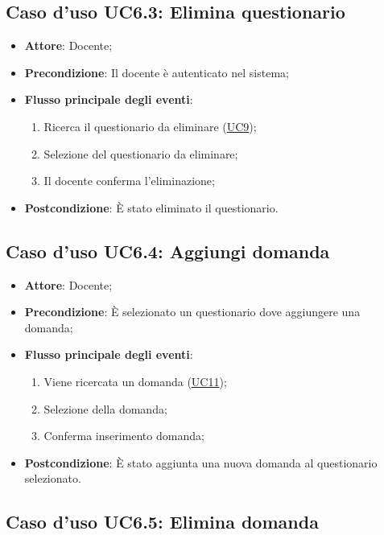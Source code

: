 \documentclass[12pt,a4paper]{article}
\begin{document}
\subsection{Caso d'uso UC6.3: Elimina questionario}

\begin{itemize}

\item \textbf{Attore}: Docente; 
\item \textbf{Precondizione}: Il docente è autenticato nel sistema;

\item \textbf{Flusso principale degli eventi}:
\begin{enumerate}
	\item Ricerca il questionario da eliminare (\hyperlink{UC9}{UC9});
	\item Selezione del questionario da eliminare;
	\item Il docente conferma l'eliminazione;
	
\end{enumerate}
\item \textbf{Postcondizione}: È stato eliminato il questionario.
\end{itemize}
\hypertarget{UC6.4}{}
\subsection{Caso d'uso UC6.4: Aggiungi domanda}

\begin{itemize}

\item \textbf{Attore}: Docente; 
\item \textbf{Precondizione}: È selezionato un questionario dove aggiungere una domanda;

\item \textbf{Flusso principale degli eventi}:
\begin{enumerate}
	\item Viene ricercata un domanda (\hyperlink{UC11}{UC11});
	\item Selezione della domanda;
	\item Conferma inserimento domanda;
	
\end{enumerate}
\item \textbf{Postcondizione}: È stato aggiunta una nuova domanda al questionario selezionato.
\end{itemize}
\hypertarget{UC6.5}{}
\subsection{Caso d'uso UC6.5: Elimina domanda}
\end{document}
